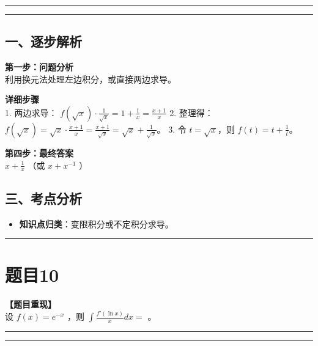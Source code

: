 \documentclass[12pt, a4paper]{ctexart}
\newcommand{\TopSeparator}{
    \par\noindent\rule{\textwidth}{1.5pt}\vspace{0.5em} %
}
\newcommand{\AnalysisSeparator}{
    \par\noindent\rule{\textwidth}{0.5pt}\vspace{0.2em}\hrule\vspace{0.5em} %
}
\newenvironment{RedAnalysis}{
    \par
    \color{red} %
}{
    \par
    \color{black} %
}
\begin{document}
\AnalysisSeparator

\begin{RedAnalysis}

\subsection*{一、逐步解析}

\textbf{第一步：问题分析} \\
利用换元法处理左边积分，或直接两边求导。

\textbf{详细步骤} \\
1. 两边求导：
   $f(\sqrt{x}) \cdot \frac{1}{\sqrt{x}} = 1 + \frac{1}{x} = \frac{x+1}{x}$
2. 整理得：$f(\sqrt{x}) = \sqrt{x} \cdot \frac{x+1}{x} = \frac{x+1}{\sqrt{x}} = \sqrt{x} + \frac{1}{\sqrt{x}}$。
3. 令 $t = \sqrt{x}$，则 $f(t) = t + \frac{1}{t}$。

\textbf{第四步：最终答案} \\
$ x + \frac{1}{x} $ （或 $ x + x^{-1} $ ）

\subsection*{三、考点分析}
\begin{itemize}
    \item \textbf{知识点归类}：变限积分或不定积分求导。
\end{itemize}

\end{RedAnalysis}

\vspace{2em}

\TopSeparator
\section*{题目10}

\textbf{【题目重现】} \\
设 $ f(x) = e^{-x} $ ，则 $ \int \frac{f'(\ln x)}{x} dx = $ \underline{\hspace{2cm}}。

\AnalysisSeparator
\end{document}
